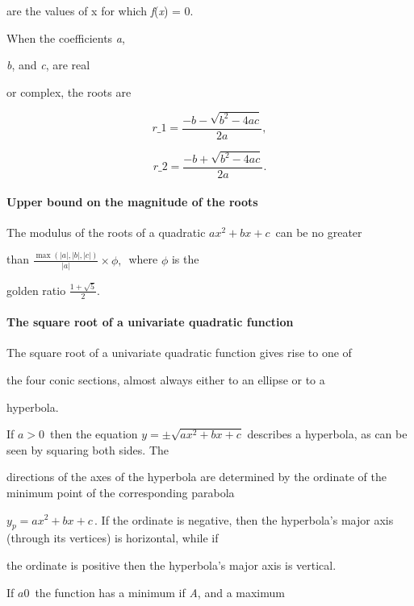 are the values of x for which \textit{f}(\textit{x}) = 0.



When the coefficients \textit{a},

\textit{b}, and \textit{c}, are real

or complex, the roots are



$$r\_1=\frac{-b - \sqrt{b^2-4ac}}{2a},$$



$$r\_2=\frac{-b + \sqrt{b^2-4ac}}{2a}.$$



\paragraph{Upper bound on the magnitude of the roots}



The modulus of the roots of a quadratic $ax^2+bx+c\,$ can be no greater

than $\frac{\max(|a|, |b|, |c|)}{|a|}\times \phi,\,$ where $\phi$ is the

golden ratio $\frac{1+\sqrt{5}}{2}.$



\paragraph{The square root of a univariate quadratic function}



The square root of a univariate quadratic function gives rise to one of

the four conic sections, almost always either to an ellipse or to a

hyperbola.



If $a>0\,$ then the equation $y = \pm \sqrt{a x^2 + b x + c}$ describes a hyperbola, as can be seen by squaring both sides. The

directions of the axes of the hyperbola are determined by the ordinate of the minimum point of the corresponding parabola

$y_p = a x^2 + b x + c \,$. If the ordinate is negative, then the hyperbola's major axis (through its vertices) is horizontal, while if

the ordinate is positive then the hyperbola's major axis is vertical.



If $a0 \,$ the function has a minimum if \textit{A}, and a maximum

